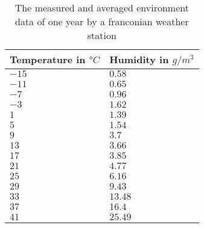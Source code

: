 \begin{table}[h!]
\centering
\begin{tabular}
{| p{3cm} | p{3cm} |}
\hline
 Temperature in $°C$ & Humidity in $g/m^3$ \\ 
\hline
 $-15$ & $0.58$ \\ 
\hline
 $-11$ & $0.65$ \\ 
\hline
 $-7$ & $0.96$ \\ 
\hline
 $-3$ & $1.62$ \\ 
\hline
 $1$ & $1.39$ \\ 
\hline
 $5$ & $1.54$ \\ 
\hline
 $9$ & $3.7$ \\ 
\hline
 $13$ & $3.66$ \\ 
\hline
 $17$ & $3.85$ \\ 
\hline
 $21$ & $4.77$ \\ 
\hline
 $25$ & $6.16$ \\ 
\hline
 $29$ & $9.43$ \\ 
\hline
 $33$ & $13.48$ \\ 
\hline
 $37$ & $16.4$ \\ 
\hline
 $41$ & $25.49$ \\ 
\hline
\end{tabular}
\label{tab:EnvironmentData}
\caption{The measured and averaged environment data of one year by a franconian weather station}
\end{table}
